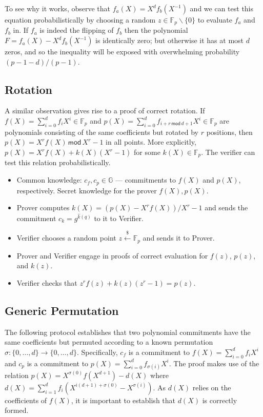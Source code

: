 \documentclass{article}
\theoremstyle{definition}
\begin{document}
To see why it works, observe that $f_a(X) = X^df_b(X^{-1})$ and we can test this equation probabilistically by choosing a random $z \in \mathbb{F}_p \backslash \{0\}$ to evaluate $f_a$ and $f_b$ in. If $f_a$ is indeed the flipping of $f_b$ then the polynomial $F = f_a(X) - X^df_b(X^{-1})$ is identically zero; but otherwise it has at most $d$ zeros, and so the inequality will be exposed with overwhelming probability $(p-1-d)/(p-1)$.

\subsection{Rotation}

A similar observation gives rise to a proof of correct rotation. If $f(X) = \sum_{i=0}^d f_i X^i \in \mathbb{F}_p$ and $p(X) = \sum_{i=0}^d f_{i+r \, \mathsf{mod} \, d+1} X^i \in \mathbb{F}_p$ are polynomials consisting of the same coefficients but rotated by $r$ positions, then $p(X) = X^r f(X) \, \mathsf{mod} \, X^r - 1$ in all points. More explicitly, $p(X) = X^r f(X) + k(X) (X^r - 1)$ for some $k(X) \in \mathbb{F}_p$. The verifier can test this relation probabilistically.

\begin{itemize}
    \item Common knowledge: $c_f, c_p \in \mathbb{G}$ --- commitments to $f(X)$ and $p(X)$, respectively. Secret knowledge for the prover $f(X), p(X)$.
    \item Prover computes $k(X) = (p(X) - X^r f(X)) / X^r - 1$ and sends the commitment $c_k = g^{\hat{k}(q)}$ to it to Verifier.
    \item Verifier chooses a random point $z \xleftarrow{\$} \mathbb{F}_p$ and sends it to Prover.
    \item Prover and Verifier engage in proofs of correct evaluation for $f(z)$, $p(z)$, and $k(z)$.
    \item Verifier checks that $z^r f(z) + k(z) (z^r-1) = p(z)$.
\end{itemize}

\subsection{Generic Permutation}

The following protocol establishes that two polynomial commitments have the same coefficients but permuted according to a known permutation $\sigma : \{0,\ldots,d\} \rightarrow \{0,\ldots,d\}$. Specifically, $c_f$ is a commitment to $f(X) = \sum_{i=0}^d f_i X^i$ and $c_p$ is a commitment to $p(X) = \sum_{i=0}^d f_{\sigma(i)} X^i$. The proof makes use of the relation $p(X) = X^{\sigma(0)} f(X^{d+1}) - d(X)$ where $d(X) = \sum_{i=1}^d f_i (X^{i(d+1) + \sigma(0)} - X^{\sigma(i)})$. As $d(X)$ relies on the coefficients of $f(X)$, it is important to establish that $d(X)$ is correctly formed.
\end{document}

